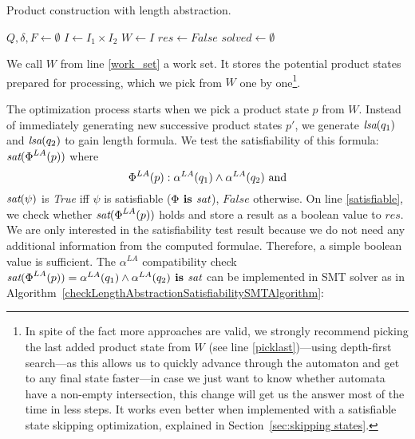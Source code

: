 \begin{algorithm}[ht]
\caption{Product construction with length abstraction.}\label{productConstructionLengthAbstrAlg}
\DontPrintSemicolon
{}
\BlankLine
$Q, \delta, F \gets \emptyset$ \;
$I \gets I_1 \times I_2$ \;
$W \gets I$ \;\label{work_set}
$res \gets False$ \;\label{sat}
$solved \gets \emptyset$ \;\label{solved}
\end{algorithm}

We call $W$ from line \ref{work_set} a work set. It stores the potential product states prepared for processing, which we pick from $W$ one by one\footnote{In spite of the fact more approaches are valid, we strongly recommend picking the last added product state from $W$ (see line \ref{picklast})---using depth-first search---as this allows us to quickly advance through the automaton and get to any final state faster---in case we just want to know whether automata have a non-empty intersection, this change will get us the answer most of the time in less steps. It works even better when implemented with a satisfiable state skipping optimization, explained in Section~\ref{sec:skipping states}.}.

The optimization process starts when we pick a product state $p$ from $W$. Instead of immediately generating new successive product states $p'$, we generate $\emph{lsa}(q_1)$ and $\emph{lsa}(q_2)$ to gain length formula. We test the satisfiability of this formula: $\emph{sat}(\emph{$\Phi$}^{LA}(p))$ where
\[
    \emph{$\Phi$}^{LA}(p) : \alpha^{LA}(q_1) \wedge \alpha^{LA}(q_2) \text{ and}
\]
$\emph{sat}(\psi)$ is \emph{True} iff $\psi$ is satisfiable ($\Phi \textbf{ is } \emph{sat}$), $False$ otherwise. On line \ref{satisfiable}, we check whether $\emph{sat}(\emph{$\Phi$}^{LA}(p))$ holds and store a result as a boolean value to $res$. We are only interested in the satisfiability test result because we do not need any additional information from the computed formulae. Therefore, a simple boolean value is sufficient. The $\alpha^{LA}$ compatibility check $\emph{sat}(\emph{$\Phi$}^{LA}(p)) = \alpha^{LA}(q_1) \land \alpha^{LA}(q_2) \textbf{ is } \emph{sat}$ can be implemented in SMT solver as in Algorithm~\ref{checkLengthAbstractionSatisfiabilitySMTAlgorithm}:

